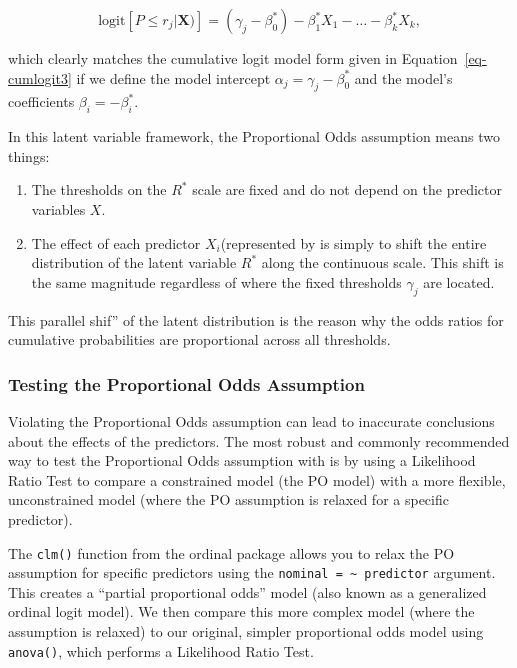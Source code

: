 \documentclass[
  letterpaper,
  DIV=11,
  numbers=noendperiod]{scrartcl}
\begin{document}
\[
\text{logit}[P \leq r_j | \boldsymbol{X})] = (\gamma_j - \beta_0^*) - \beta_1^*X_1 - \dots - \beta_k^*X_k,
\]

which clearly matches the cumulative logit model form given in
Equation~\ref{eq-cumlogit3} if we define the model intercept
\(\alpha_j = \gamma_j - \beta_0^*\) and the model's coefficients
\(\beta_i = -\beta_i^*\).

In this latent variable framework, the Proportional Odds assumption
means two things:

\begin{enumerate}
\def\labelenumi{\arabic{enumi}.}
\item
  The thresholds on the \(R^*\) scale are fixed and do not depend on the
  predictor variables \(X\).
\item
  The effect of each predictor \(X_i\)(represented by is simply to shift
  the entire distribution of the latent variable \(R^*\) along the
  continuous scale. This shift is the same magnitude regardless of where
  the fixed thresholds \(\gamma_j\) are located.
\end{enumerate}

This parallel shif'' of the latent distribution is the reason why the
odds ratios for cumulative probabilities are proportional across all
thresholds.

\hypertarget{testing-the-proportional-odds-assumption}{%
\subsubsection*{Testing the Proportional Odds
Assumption}\label{testing-the-proportional-odds-assumption}}

Violating the Proportional Odds assumption can lead to inaccurate
conclusions about the effects of the predictors. The most robust and
commonly recommended way to test the Proportional Odds assumption with
is by using a Likelihood Ratio Test to compare a constrained model (the
PO model) with a more flexible, unconstrained model (where the PO
assumption is relaxed for a specific predictor).

The \texttt{clm()} function from the ordinal package allows you to relax
the PO assumption for specific predictors using the
\texttt{nominal\ =\ \textasciitilde{}\ predictor} argument. This creates
a ``partial proportional odds'' model (also known as a generalized
ordinal logit model). We then compare this more complex model (where the
assumption is relaxed) to our original, simpler proportional odds model
using \texttt{anova()}, which performs a Likelihood Ratio Test.
\end{document}
